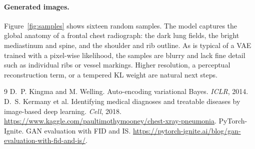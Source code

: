 \documentclass{article}
\begin{document}
\paragraph{Generated images.}
Figure~\ref{fig:samples} shows sixteen random samples. The model captures the global anatomy
of a frontal chest radiograph: the dark lung fields, the bright mediastinum and spine, and the
shoulder and rib outline. As is typical of a VAE trained with a pixel-wise likelihood, the
samples are blurry and lack fine detail such as individual ribs or vessel markings. Higher
resolution, a perceptual reconstruction term, or a tempered KL weight are natural next steps.

\begin{thebibliography}{9}
\footnotesize
{} D.~P. Kingma and M. Welling. Auto-encoding variational Bayes. \emph{ICLR}, 2014.
 D.~S. Kermany et al. Identifying medical diagnoses and treatable diseases by image-based deep learning. \emph{Cell}, 2018. \url{https://www.kaggle.com/paultimothymooney/chest-xray-pneumonia}.
 PyTorch-Ignite. GAN evaluation with FID and IS. \url{https://pytorch-ignite.ai/blog/gan-evaluation-with-fid-and-is/}.
\end{thebibliography}
\end{document}
